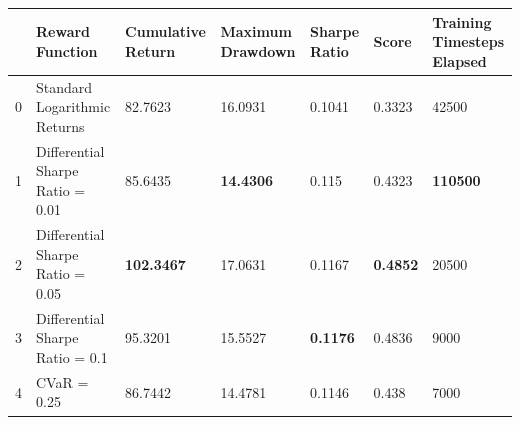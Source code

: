 \begin{tabular}{lllllll}
\toprule
 & Reward Function & Cumulative Return & Maximum Drawdown & Sharpe Ratio & Score & Training Timesteps Elapsed \\
\midrule
0 & Standard Logarithmic Returns & 82.7623 & 16.0931 & 0.1041 & 0.3323 & 42500 \\
1 & Differential Sharpe Ratio = 0.01 & 85.6435 & \textbf{14.4306} & 0.115 & 0.4323 & \textbf{110500} \\
2 & Differential Sharpe Ratio = 0.05 & \textbf{102.3467} & 17.0631 & 0.1167 & \textbf{0.4852} & 20500 \\
3 & Differential Sharpe Ratio = 0.1 & 95.3201 & 15.5527 & \textbf{0.1176} & 0.4836 & 9000 \\
4 & CVaR = 0.25 & 86.7442 & 14.4781 & 0.1146 & 0.438 & 7000 \\
\bottomrule
\end{tabular}
